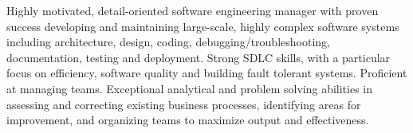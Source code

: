 

\begin{cvparagraph}

Highly motivated, detail-oriented software engineering manager with proven success developing and maintaining large-scale, highly complex software systems including architecture, design, coding, debugging/troubleshooting, documentation, testing and deployment. Strong SDLC skills, with a particular focus on efficiency, software quality and building fault tolerant systems.  Proficient at managing teams.  Exceptional analytical and problem solving abilities in assessing and correcting existing business processes, identifying areas for improvement, and organizing teams to maximize output and effectiveness.
\end{cvparagraph}
